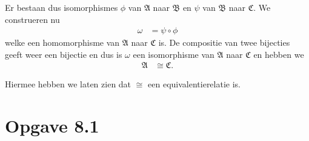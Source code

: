 \documentclass[a4paper,11pt]{article}
\begin{document}
\begin{description}
Er bestaan dus isomorphismes $\phi$ van $\mathfrak{A}$ naar $\mathfrak{B}$ en
$\psi$ van $\mathfrak{B}$ naar $\mathfrak{C}$. We construeren nu
\begin{align*}
\omega &= \psi \circ \phi
\end{align*}
welke een homomorphisme van $\mathfrak{A}$ naar $\mathfrak{C}$ is. De
compositie van twee bijecties geeft weer een bijectie en dus is $\omega$ een
isomorphisme van $\mathfrak{A}$ naar $\mathfrak{C}$ en hebben we
\begin{align*}
\mathfrak{A} &\cong \mathfrak{C}.
\end{align*}

Hiermee hebben we laten zien dat $\cong$ een equivalentierelatie is.\\[2em]

\end{description}


\section*{Opgave 8.1}
\end{document}
